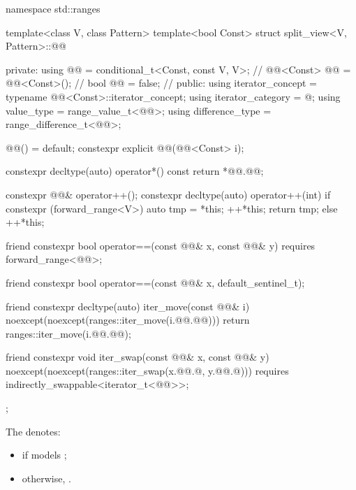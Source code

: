 %
\begin{codeblock}
namespace std::ranges {
  template<class V, class Pattern>
  template<bool Const>
  struct split_view<V, Pattern>::@@ {
  private:
    using @@ = conditional_t<Const, const V, V>;      // \expos
    @@<Const> @@ = @@<Const>(); // \expos
    bool @@ = false;                          // \expos
  public:
    using iterator_concept  = typename @@<Const>::iterator_concept;
    using iterator_category = @\seebelow@;
    using value_type        = range_value_t<@@>;
    using difference_type   = range_difference_t<@@>;

    @@() = default;
    constexpr explicit @@(@@<Const> i);

    constexpr decltype(auto) operator*() const { return *@@.@@; }

    constexpr @@& operator++();
    constexpr decltype(auto) operator++(int) {
      if constexpr (forward_range<V>) {
        auto tmp = *this;
        ++*this;
        return tmp;
      } else
        ++*this;
    }

    friend constexpr bool operator==(const @@& x, const @@& y)
      requires forward_range<@@>;

    friend constexpr bool operator==(const @@& x, default_sentinel_t);

    friend constexpr decltype(auto) iter_move(const @@& i)
    noexcept(noexcept(ranges::iter_move(i.@@.@@))) {
      return ranges::iter_move(i.@@.@@);
    }

    friend constexpr void iter_swap(const @@& x, const @@& y)
      noexcept(noexcept(ranges::iter_swap(x.@@.@, y.@@.@)))
      requires indirectly_swappable<iterator_t<@@>>;
  };
}
\end{codeblock}

\pnum
The   denotes:
\begin{itemize}
\item
{} if
 models \linebreak
{};
\item otherwise, .
\end{itemize}


